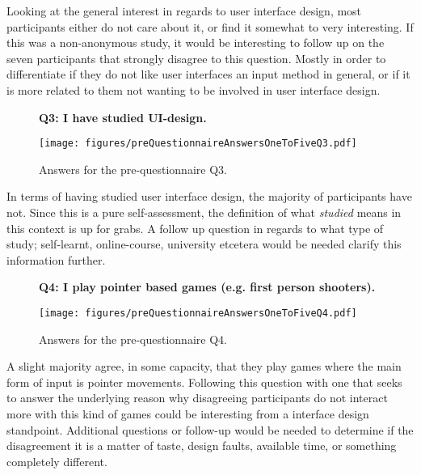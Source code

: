     Looking at the general interest in regards to user interface design,
    most participants either do not care about it, or find it somewhat to
    very interesting. If this was a non-anonymous study, it would be
    interesting to follow up on the seven participants that strongly
    disagree to this question. Mostly in order to differentiate if they do
    not like user interfaces an input method in general, or if it is more
    related to them not wanting to be involved in user interface design.

    \begin{figure}[h!]
      \textbf{Q3: I have studied UI-design.}
      \begin{center}
        \texttt{[image: figures/preQuestionnaireAnswersOneToFiveQ3.pdf]}
        \vspace{-1cm}
        \caption{Answers for the pre-questionnaire Q3.}
      \end{center}
    \end{figure}

    In terms of having studied user interface design, the majority of
    participants have not. Since this is a pure self-assessment, the
    definition of what \textit{studied} means in this context is up for
    grabs. A follow up question in regards to what type of study;
    self-learnt, online-course, university etcetera would be needed clarify
    this information further.

    \begin{figure}[h!]
      \textbf{Q4: I play pointer based games (e.g. first person shooters).}
      \begin{center}
        \texttt{[image: figures/preQuestionnaireAnswersOneToFiveQ4.pdf]}
        \vspace{-1cm}
        \caption{Answers for the pre-questionnaire Q4.}
      \end{center}
    \end{figure}

    A slight majority agree, in some capacity, that they play games where
    the main form of input is pointer movements. Following this question
    with one that seeks to answer the underlying reason why disagreeing
    participants do not interact more with this kind of games could be
    interesting from a interface design standpoint. Additional questions or
    follow-up would be needed to determine if the disagreement it is a
    matter of taste, design faults, available time, or something completely
    different.

